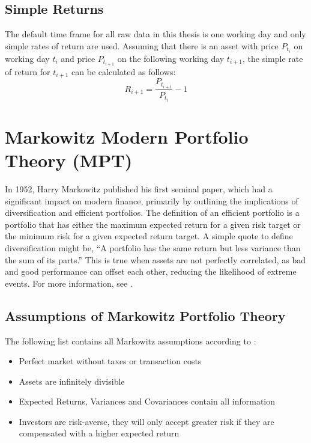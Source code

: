 \documentclass[
  oneside]{book}
\providecommand{\tightlist}{%
  \setlength{\itemsep}{0pt}\setlength{\parskip}{0pt}}
\begin{document}
\hypertarget{simple-returns}{%
\subsection{Simple Returns}\label{simple-returns}}

The default time frame for all raw data in this thesis is one working day and only simple rates of return are used. Assuming that there is an asset with price \(P_{t_i}\) on working day \(t_i\) and price \(P_{t_{i+1}}\) on the following working day \(t_{i+1}\), the simple rate of return for \(t_{i+1}\) can be calculated as follows:
\[
  R_{i+1} = \frac{P_{t_{i+1}}}{P_{t_i}}-1
\]

\hypertarget{markowitz-modern-portfolio-theory-mpt}{%
\section{Markowitz Modern Portfolio Theory (MPT)}\label{markowitz-modern-portfolio-theory-mpt}}

In 1952, Harry Markowitz published his first seminal paper, which had a significant impact on modern finance, primarily by outlining the implications of diversification and efficient portfolios. The definition of an efficient portfolio is a portfolio that has either the maximum expected return for a given risk target or the minimum risk for a given expected return target. A simple quote to define diversification might be, ``A portfolio has the same return but less variance than the sum of its parts.'' This is true when assets are not perfectly correlated, as bad and good performance can offset each other, reducing the likelihood of extreme events. For more information, see \citep{Mari2005}.

\hypertarget{assumptions-of-markowitz-portfolio-theory}{%
\subsection{Assumptions of Markowitz Portfolio Theory}\label{assumptions-of-markowitz-portfolio-theory}}

The following list contains all Markowitz assumptions according to \citep{Mari2005}:

\vspace{-0.4cm}

\begin{itemize}
\tightlist
\item
  Perfect market without taxes or transaction costs
\item
  Assets are infinitely divisible
\item
  Expected Returns, Variances and Covariances contain all information
\item
  Investors are risk-averse, they will only accept greater risk if they
  are compensated with a higher expected return
\end{itemize}
\end{document}
